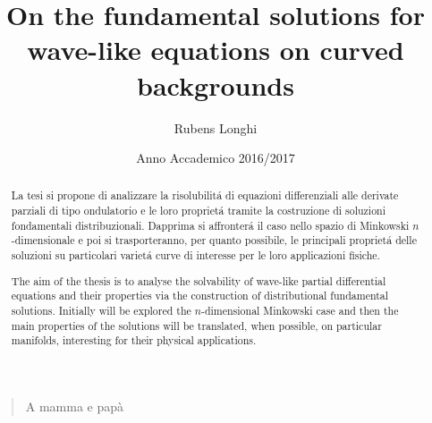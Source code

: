 \documentclass[11pt,a4paper,twoside]{memoir} %
\title{On the fundamental solutions for wave-like equations on curved backgrounds} %
\author{Rubens Longhi} %
\date{Anno Accademico 2016/2017} %
\begin{document}
\begin{titlingpage}
\maketitle %
\end{titlingpage}

\thispagestyle{empty}

\bigskip\begin{quotation}\begin{center}\begin{em}
			
			\hfill A mamma e pap\`{a}
			
		\par\end{em}\end{center}\end{quotation}

\cleartoverso %


\thispagestyle{empty}
\begin{abstract}
	\noindent La tesi si propone di analizzare la risolubilit\'a di equazioni differenziali alle derivate parziali di tipo ondulatorio e le loro propriet\'a tramite la costruzione di soluzioni fondamentali distribuzionali. Dapprima si affronter\'a il caso nello spazio di Minkowski $n$-dimensionale e poi si trasporteranno, per quanto possibile, le principali propriet\'a delle soluzioni su particolari variet\'a curve di interesse per le loro applicazioni fisiche.\\

	\hfill
	
	\noindent The aim of the thesis is to analyse the solvability of wave-like partial differential equations and their properties via the construction of distributional fundamental solutions. Initially will be explored the $n$-dimensional Minkowski case and then the main properties of the solutions will be translated, when possible, on particular manifolds, interesting for their physical applications.
\end{abstract}

\cleartoverso %

\frontmatter %
\end{document}
